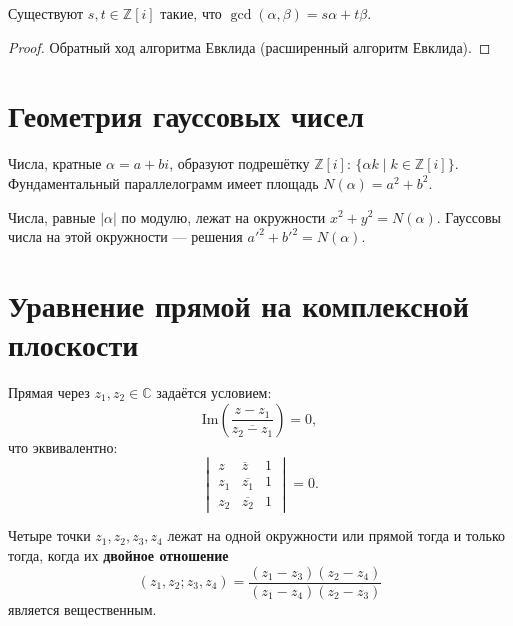 \documentclass[12pt]{article}
\begin{document}
\begin{theorem}
Существуют $s, t \in \mathbb{Z}[i]$ такие, что
$\gcd(\alpha,\beta) = s\alpha + t\beta$.
\end{theorem}

\begin{proof}
Обратный ход алгоритма Евклида (расширенный алгоритм Евклида).
\end{proof}

\section{Геометрия гауссовых чисел}

\begin{note}
Числа, кратные $\alpha = a+bi$, образуют подрешётку $\mathbb{Z}[i]$:
$\{\alpha k \mid k \in \mathbb{Z}[i]\}$.
Фундаментальный параллелограмм имеет площадь $N(\alpha) = a^2+b^2$.
\end{note}

\begin{note}
Числа, равные $|\alpha|$ по модулю, лежат на окружности
$x^2 + y^2 = N(\alpha)$.
Гауссовы числа на этой окружности ---
решения $a'^2 + b'^2 = N(\alpha)$.
\end{note}

\section{Уравнение прямой на комплексной плоскости}

\begin{theorem}
Прямая через $z_1, z_2 \in \mathbb{C}$ задаётся условием:
\[
\mathrm{Im}\!\left(\frac{z - z_1}{\overline{z_2 - z_1}}\right) = 0,
\]
что эквивалентно:
\[
\begin{vmatrix} z & \overline{z} & 1 \\ z_1 & \overline{z_1} & 1 \\
z_2 & \overline{z_2} & 1 \end{vmatrix} = 0.
\]
\end{theorem}

\begin{definition}
Четыре точки $z_1,z_2,z_3,z_4$ лежат на одной окружности или прямой
тогда и только тогда, когда их \textbf{двойное отношение}
\[
(z_1,z_2;z_3,z_4) = \frac{(z_1-z_3)(z_2-z_4)}{(z_1-z_4)(z_2-z_3)}
\]
является вещественным.
\end{definition}
\end{document}

